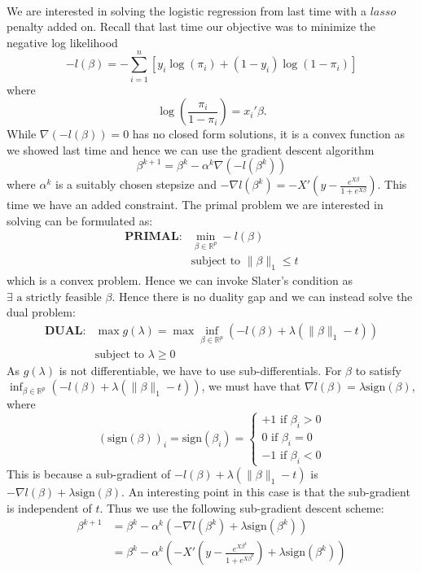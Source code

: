 \documentclass[12pt, leqno]{article}
\providecommand{\norm}[1]{\lVert#1\rVert}
\newcommand{\sign}{\mathrm{sign}}
\begin{document}
\paragraph{} We are interested in solving the
logistic regression from last time with a $lasso$ penalty added
on. Recall that last time our objective was to minimize the negative log likelihood 
\[
-l(\beta) = -\sum_{i=1}^{n} [y_i \log (\pi_i)+ (1-y_i) \log (1-\pi_i)]
\]
where 
\[
\log (\frac{\pi_i}{1-\pi_i}) = {x_i' \beta}.
\]
While $\nabla (-l(\beta)) = 0$ has no closed form solutions, it is a convex function as we
showed last time and hence we can use the gradient descent algorithm 
\[
\beta^{k+1} = \beta^{k} - \alpha^k \nabla (-l(\beta^k))
\]
where $\alpha^k$ is a suitably chosen stepsize and $-\nabla l(\beta^k) = -X'(y-\frac{e^{X \beta}}{1+e^{X
    \beta}})$.
This time we have an added constraint. The primal problem we are
interested in solving can be formulated as:
\begin{align*}
\textbf{PRIMAL:}&
\min_{\beta \in \mathbb{R}^p} -l(\beta) \\
&\text{subject to } \norm{\beta}_1 \leq t
\end{align*}
which is a convex problem. Hence we can invoke Slater's condition as
$\exists \text{ a strictly feasible } \beta$. Hence there is no duality
gap and we can instead solve the dual problem:
\begin{align*}
\textbf{DUAL:}&
\max g(\lambda) = \max \inf_{\beta \in \mathbb{R}^p}(-l(\beta)+\lambda(\norm{\beta}_1-t)) \\
&\text{subject to } \lambda \geq 0
\end{align*}
As $g(\lambda)$ is not differentiable, we have to use
sub-differentials. For $\beta$ to satisfy $\inf_{\beta \in
  \mathbb{R}^p}(-l(\beta)+\lambda(\norm{\beta}_1-t))$, we must have
that $\nabla l(\beta) = \lambda \sign(\beta)$, where 
\[
(\sign(\beta))_i = \sign(\beta_i)  = \begin{cases} +1 \text { if }
  \beta_i>0 \\
0 \text { if }
  \beta_i=0 \\
-1 \text { if }
  \beta_i<0
\end{cases}
\] 
This is because a sub-gradient of
$-l(\beta)+\lambda(\norm{\beta}_1-t)$ is $-\nabla l(\beta)+ \lambda
\sign({\beta})$. An interesting point in this case is that the sub-gradient is
independent of $t$. Thus we use the following sub-gradient descent scheme:
\begin{align*}
\beta^{k+1} &= \beta^{k} - \alpha^k( -\nabla l(\beta^k)+ \lambda
\sign({\beta^k})) \\
&= \beta^{k} - \alpha^k( -X'(y-\frac{e^{X \beta^k}}{1+e^{X
    \beta^k}})+ \lambda
\sign({\beta^k})) 
\end{align*}
\end{document}

